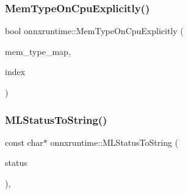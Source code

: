 \subsubsection{\texorpdfstring{Mem\+Type\+On\+Cpu\+Explicitly()}{MemTypeOnCpuExplicitly()}}
{\footnotesize\ttfamily bool onnxruntime\+::\+Mem\+Type\+On\+Cpu\+Explicitly (\begin{DoxyParamCaption}\item[{const \mbox{\hyperlink{namespaceonnxruntime_ad53d5ace215052258a4346ee68c2624e}{Mem\+Type\+Map}} \&}]{mem\+\_\+type\+\_\+map,  }\item[{\mbox{\hyperlink{mlasi_8h_a503efbc1c6e50825320ad909366b78ab}{size\+\_\+t}}}]{index }\end{DoxyParamCaption})\hspace{0.3cm}{\ttfamily [inline]}}

\mbox{\label{namespaceonnxruntime_ac569cd1c6513266641c006ed2bf5e0d9}} 
\subsubsection{\texorpdfstring{M\+L\+Status\+To\+String()}{MLStatusToString()}}
{\footnotesize\ttfamily const char$\ast$ onnxruntime\+::\+M\+L\+Status\+To\+String (\begin{DoxyParamCaption}\item[{\mbox{\hyperlink{namespaceonnxruntime_a8e92b0a23759ea70b95aff5087add622}{M\+L\+Status}}}]{status }\end{DoxyParamCaption})\hspace{0.3cm}{\ttfamily [inline]}, {\ttfamily [noexcept]}}

\mbox{\label{namespaceonnxruntime_a89fdcad44d0ca3329d9d6cfbb948c00c}} 
